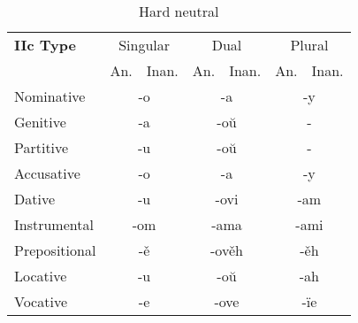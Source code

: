 \begin{table}[!htb]
	\caption{Hard neutral}
	\begin{tabular}{lllllll}
		\textbf{IIc Type}       
		& \multicolumn{2}{c}{Singular} 
		& \multicolumn{2}{c}{Dual} 
		& \multicolumn{2}{c}{Plural} \\
		& An.   & Inan.  & An.   & Inan.   & An.  & Inan. \\
		Nominative    & \multicolumn{2}{c}{-o}      
		& \multicolumn{2}{c}{-a}        
		& \multicolumn{2}{c}{-y} \\
		Genitive      & \multicolumn{2}{c}{-a}       
		& \multicolumn{2}{c}{-oŭ}      
		& \multicolumn{2}{c}{-}   \\
		Partitive     & \multicolumn{2}{c}{-u}       
		& \multicolumn{2}{c}{-oŭ}      
		& \multicolumn{2}{c}{-} \\
		Accusative    & \multicolumn{2}{c}{-o}     
		& \multicolumn{2}{c}{-a} 
		& \multicolumn{2}{c}{-y} \\
		Dative        & \multicolumn{2}{c}{-u}       
		& \multicolumn{2}{c}{-ovi}     
		& \multicolumn{2}{c}{-am} \\
		Instrumental  & \multicolumn{2}{c}{-om}     
		& \multicolumn{2}{c}{-ama}     
		& \multicolumn{2}{c}{-ami} \\
		Prepositional & \multicolumn{2}{c}{-ě}       
		& \multicolumn{2}{c}{-ověh}     
		& \multicolumn{2}{c}{-ěh} \\
		Locative      & \multicolumn{2}{c}{-u}      
		& \multicolumn{2}{c}{-oŭ}       
		& \multicolumn{2}{c}{-ah} \\ 
		Vocative      & \multicolumn{2}{c}{-e}       
		& \multicolumn{2}{c}{-ove}      
		& \multicolumn{2}{c}{-ïe}
	\end{tabular}
\end{table}

